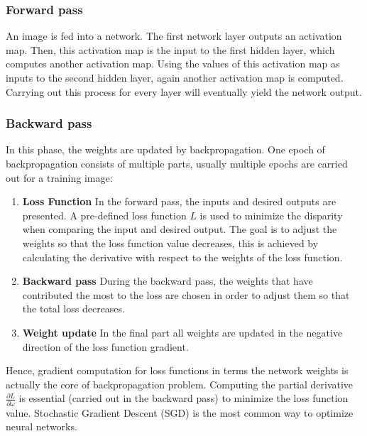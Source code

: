     \subsubsection{Forward pass}
    An image is fed into a network. The first network layer outputs an activation map. Then, this activation map is the input to the first hidden layer, which computes another activation map. Using the values of this activation map as inputs to the second hidden layer, again another activation map is computed. Carrying out this process for every layer will eventually yield the network output.

    \subsubsection{Backward pass}
    In this phase, the weights are updated by backpropagation. One epoch of backpropagation consists of multiple parts, usually multiple epochs are carried out for a training image:
    \begin{enumerate}
        \item \textbf{Loss Function} In the forward pass, the inputs and desired outputs are presented. A pre-defined loss function $L$ is used to minimize the disparity when comparing the input and desired output. The goal is to adjust the weights so that the loss function value decreases, this is achieved by calculating the derivative with respect to the weights of the loss function.
        \item \textbf{Backward pass} During the backward pass, the weights that have contributed the most to the loss are chosen in order to adjust them so that the total loss decreases.
        \item \textbf{Weight update} In the final part all weights are updated in the negative direction of the loss function gradient.
    \end{enumerate}
    
    Hence, gradient computation for loss functions in terms the network weights is actually the core of backpropagation problem. Computing the partial derivative $\frac{\partial L}{\partial \omega}$ is essential (carried out in the backward pass) to minimize the loss function value. Stochastic Gradient Descent (SGD) is the most common way to optimize neural networks.

